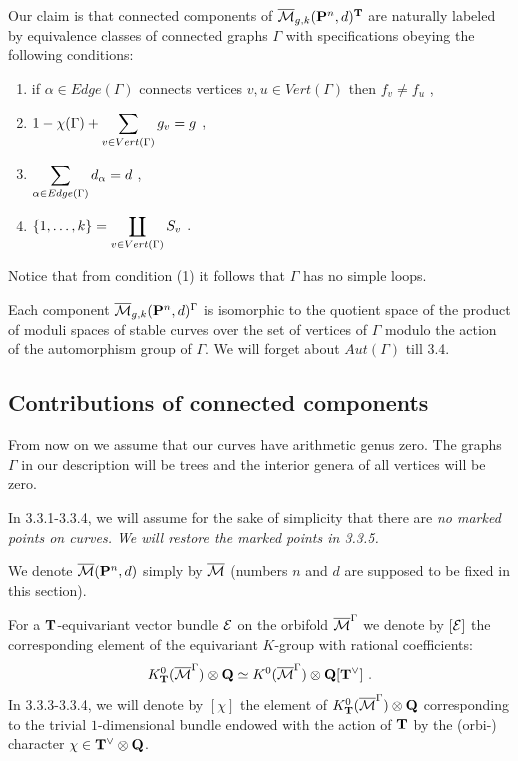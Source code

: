 \documentclass{amsart}
\begin{document}
Our claim is that connected components of $ \overline{\mathcal{M}}_{g,k}(\mathbf P^n,d)^{\mathbf T}$ are
naturally labeled by equivalence classes of connected graphs $\Gamma$ with
specifications
 obeying the following conditions:
\begin{enumerate}
\item if  $\alpha\in Edge (\Gamma)$ connects vertices $v,u\in Vert(\Gamma)$
then $f_v\ne f_u\,\,$,
\item $1-\chi(\Gamma)+\displaystyle\sum_{v\in Vert(\Gamma)}g_v=g\,\,$,
\item $\displaystyle\sum_{\alpha\in Edge(\Gamma)}d_{\alpha}=d\,\,$,
\item $\{1,\dots,k\}=\displaystyle\coprod_{v\in Vert(\Gamma)} S_v\,\,$.
\end{enumerate}
Notice that from  condition (1) it follows that $\Gamma$ has no simple loops.

 Each component $\overline{\mathcal{M}}_{g,k}(\mathbf P^n,d)^{\Gamma}$ is isomorphic to the quotient space
of the product of moduli spaces of stable curves over the set of vertices of
$\Gamma$ modulo the action of the automorphism group of $\Gamma$. We will
forget about $Aut(\Gamma)$ till 3.4.




\subsection{Contributions of connected components}


{}From now on we assume that our curves have arithmetic genus zero.
 The graphs $\Gamma$ in our description will be  trees and the interior genera
of all vertices will be zero.

In 3.3.1-3.3.4, we will assume for the sake of simplicity that there are  \it
no marked points \rm on curves. We will restore the marked points in 3.3.5.

We denote $\overline{\mathcal{M}}(\mathbf P^n,d)$ simply by $\overline{\mathcal{M}}$ (numbers $n$ and $d$ are supposed to be
fixed in this section).

 For a $\mathbf T$-equivariant vector bundle $\mathcal E$ on the orbifold $\overline{\mathcal{M}}^{\Gamma}$ we
denote by $[\mathcal E]$ the corresponding element
of the equivariant $K$-group with rational coefficients:
$$K_{\mathbf T}^0(\overline{\mathcal{M}}^{\Gamma})\otimes \mathbf Q\simeq
K^0(\overline{\mathcal{M}}^{\Gamma})\otimes \mathbf Q[\mathbf T^{\vee}]\,\,.$$
In 3.3.3-3.3.4, we will denote by $[\chi]$ the element of
$K_{\mathbf T}^0(\overline{\mathcal{M}}^{\Gamma})\otimes \mathbf Q$ corresponding to the trivial $1$-dimensional
bundle endowed with the action of $\mathbf T$ by the  (orbi-) character $\chi\in
\mathbf T^{\vee}\otimes\mathbf Q$.
\end{document}
